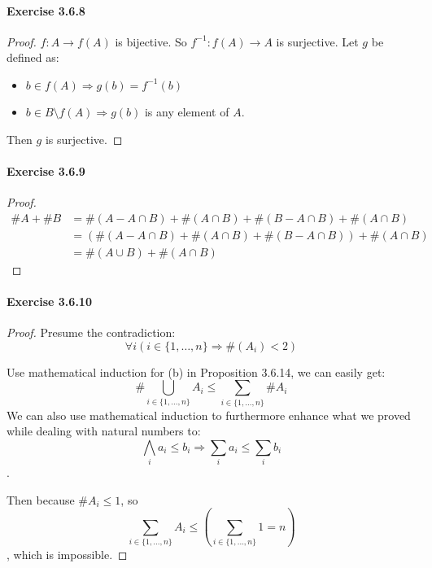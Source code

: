 \paragraph{Exercise 3.6.8} \label{exercise3.6.8}
\begin{proof}
$f:A \rightarrow f(A)$ is bijective. So $f^{-1}: f(A) \rightarrow A$ is surjective. Let $g$ be defined as:
\begin{itemize}
\item $b \in f(A) \Longrightarrow g(b) = f^{-1}(b)$
\item $b \in B\setminus f(A) \Longrightarrow g(b)$ is any element of $A$.
\end{itemize}

Then $g$ is surjective.
\end{proof}

\paragraph{Exercise 3.6.9} \label{exercise3.6.9}
\begin{proof}
\begin{align*}
\#A + \#B 
&= \#(A - A \cap B) + \#(A \cap B) + \#(B - A \cap B) + \#(A \cap B) \\
&= (\#(A - A \cap B) + \#(A \cap B) + \#(B - A \cap B)) + \#(A \cap B) \\
&= \#(A \cup B) + \#(A \cap B)
\end{align*}
\end{proof}

\paragraph{Exercise 3.6.10} \label{exercise3.6.10}
\begin{proof}
Presume the contradiction:
\[
\forall i(i \in \{1,\dots,n\} \Longrightarrow \#(A_i) < 2)
\]

Use mathematical induction for (b) in Proposition 3.6.14, we can easily get:
\[
\#\bigcup_{i \in \{1,\dots,n\}}A_i \leq \sum_{i \in \{1,\dots,n\}} \#A_i
\]
We can also use mathematical induction to furthermore enhance what we proved while dealing with natural 
numbers to:
\[
\bigwedge_{i} a_{i} \leq b_{i} \Longrightarrow \sum_{i} a_{i} \leq \sum_{i} b_i
\].

Then because $\# A_i \leq 1$, so 
\[
\sum_{i \in \{1,\dots,n\}} A_i \leq (\sum_{i \in \{1,\dots,n\}} 1 = n)
\], 
which is impossible.
\end{proof}
